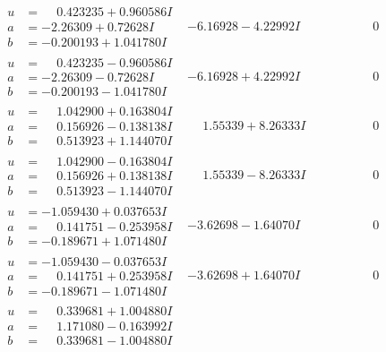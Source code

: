 \documentclass[1p]{elsarticle_modified}
\theoremstyle{definition}
\begin{document}
$$\begin{array}{c|c|c}
\begin{aligned}
u &= \phantom{-}0.423235 + 0.960586 I \\
a &= -2.26309 + 0.72628 I \\
b &= -0.200193 + 1.041780 I\end{aligned}
 & -6.16928 - 4.22992 I & \phantom{-0.000000 } 0 \\ \hline\begin{aligned}
u &= \phantom{-}0.423235 - 0.960586 I \\
a &= -2.26309 - 0.72628 I \\
b &= -0.200193 - 1.041780 I\end{aligned}
 & -6.16928 + 4.22992 I & \phantom{-0.000000 } 0 \\ \hline\begin{aligned}
u &= \phantom{-}1.042900 + 0.163804 I \\
a &= \phantom{-}0.156926 - 0.138138 I \\
b &= \phantom{-}0.513923 + 1.144070 I\end{aligned}
 & \phantom{-}1.55339 + 8.26333 I & \phantom{-0.000000 } 0 \\ \hline\begin{aligned}
u &= \phantom{-}1.042900 - 0.163804 I \\
a &= \phantom{-}0.156926 + 0.138138 I \\
b &= \phantom{-}0.513923 - 1.144070 I\end{aligned}
 & \phantom{-}1.55339 - 8.26333 I & \phantom{-0.000000 } 0 \\ \hline\begin{aligned}
u &= -1.059430 + 0.037653 I \\
a &= \phantom{-}0.141751 - 0.253958 I \\
b &= -0.189671 + 1.071480 I\end{aligned}
 & -3.62698 - 1.64070 I & \phantom{-0.000000 } 0 \\ \hline\begin{aligned}
u &= -1.059430 - 0.037653 I \\
a &= \phantom{-}0.141751 + 0.253958 I \\
b &= -0.189671 - 1.071480 I\end{aligned}
 & -3.62698 + 1.64070 I & \phantom{-0.000000 } 0 \\ \hline\begin{aligned}
u &= \phantom{-}0.339681 + 1.004880 I \\
a &= \phantom{-}1.171080 - 0.163992 I \\
b &= \phantom{-}0.339681 - 1.004880 I\end{aligned}

\end{array}$$
\end{document}
